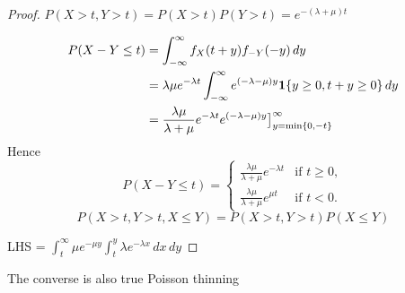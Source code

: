 \begin{proof}
    $P(X > t, Y > t) = P(X > t) P(Y > t) = e^{-(\lambda + \mu)t}$

\begin{align*}
    P(X - Y \leq t) & = \int_{-\infty}^\infty f_X(t+y) f_{-Y}(-y)\,dy \\
    & = \lambda \mu e^{-\lambda t} \int_{-\infty}^\infty e^{(-\lambda - \mu)y}\mathbf{1}\{y \geq 0, t + y\geq 0\}\,dy \\
    & = \frac{\lambda \mu}{\lambda + \mu}e^{-\lambda t} e^{(-\lambda - \mu)y}\bigr]_{y=\min\{0,-t\}}^\infty
\end{align*}
Hence \[
    P(X - Y \leq t) = \begin{cases}
      \frac{\lambda \mu}{\lambda + \mu}e^{-\lambda t}  & \text{if } t \geq 0, \\
      \frac{\lambda \mu}{\lambda + \mu}e^{\mu t}  & \text{if } t< 0.
    \end{cases}
\]
    \[P(X > t,Y > t,X \leq Y) = P(X > t, Y > t) P(X \leq Y)\]

LHS = $\int_{t}^\infty \mu e^{-\mu y} \int_{t}^y \lambda e^{-\lambda x}\,dx\,dy$


\end{proof}

The converse is also true Poisson thinning


\begin{namedthm}
    
\end{namedthm}

\begin{namedthm}
    
\end{namedthm}

\begin{namedthm}
    
\end{namedthm}

\begin{namedthm}
    
\end{namedthm}

\begin{namedthm}
    
\end{namedthm}

\begin{namedthm}
    
\end{namedthm}

\printnomenclature